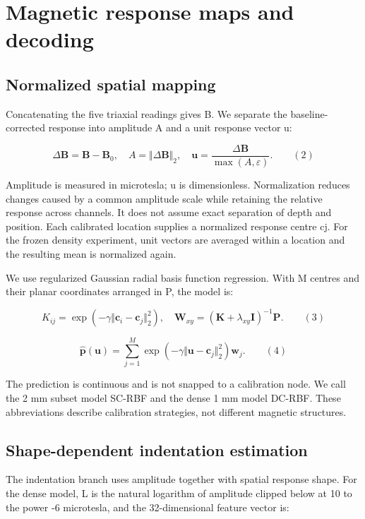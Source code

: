 \documentclass[preprint,12pt]{elsarticle}
\begin{document}
\section{Magnetic response maps and decoding}

\subsection{Normalized spatial mapping}

Concatenating the five triaxial readings gives B. We separate the baseline-corrected response into amplitude A and a unit response vector u:

\[\Delta\mathbf{B}=\mathbf{B}-\mathbf{B}_0,\quad A=\Vert\Delta\mathbf{B}\Vert_2,\quad\mathbf{u}=\frac{\Delta\mathbf{B}}{\max(A,\varepsilon)}.\qquad (2)\]

Amplitude is measured in microtesla; u is dimensionless. Normalization reduces changes caused by a common amplitude scale while retaining the relative response across channels. It does not assume exact separation of depth and position. Each calibrated location supplies a normalized response centre cj. For the frozen density experiment, unit vectors are averaged within a location and the resulting mean is normalized again.

We use regularized Gaussian radial basis function regression. With M centres and their planar coordinates arranged in P, the model is:

\[K_{ij}=\exp(-\gamma\Vert\mathbf{c}_i-\mathbf{c}_j\Vert_2^2),\quad\mathbf{W}_{xy}=(\mathbf{K}+\lambda_{xy}\mathbf{I})^{-1}\mathbf{P}.\qquad (3)\]

\[\widehat{\mathbf{p}}(\mathbf{u})=\sum_{j=1}^{M}\exp(-\gamma\Vert\mathbf{u}-\mathbf{c}_j\Vert_2^2)\mathbf{w}_j.\qquad (4)\]

The prediction is continuous and is not snapped to a calibration node. We call the 2 mm subset model SC-RBF and the dense 1 mm model DC-RBF. These abbreviations describe calibration strategies, not different magnetic structures.

\subsection{Shape-dependent indentation estimation}

The indentation branch uses amplitude together with spatial response shape. For the dense model, L is the natural logarithm of amplitude clipped below at 10 to the power -6 microtesla, and the 32-dimensional feature vector is:
\end{document}
